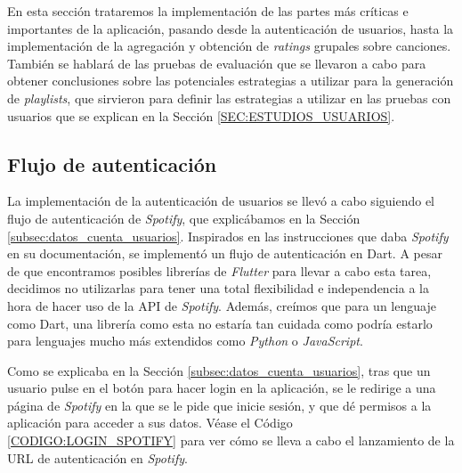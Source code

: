 En esta sección trataremos la implementación de las partes más críticas e importantes de la aplicación, pasando desde la 
autenticación de usuarios, hasta la implementación de la agregación y obtención de \textit{ratings} grupales sobre canciones. 
También se hablará de las pruebas de evaluación que se llevaron a cabo para obtener conclusiones sobre las potenciales estrategias
 a utilizar para la generación de \textit{playlists}, que sirvieron para definir las estrategias a utilizar en las pruebas con usuarios
 que se explican en la Sección \ref{SEC:ESTUDIOS_USUARIOS}.


\subsection{Flujo de autenticación\label{SEC:FLUJO_AUTENTICACION}}

La implementación de la autenticación de usuarios se llevó a cabo siguiendo el flujo de autenticación de \textit{Spotify}, que explicábamos en la Sección 
\ref{subsec:datos_cuenta_usuarios}. Inspirados en las instrucciones que daba \textit{Spotify} en su documentación, se implementó un flujo de autenticación
en Dart. A pesar de que encontramos posibles librerías de \textit{Flutter} para llevar a cabo esta tarea, decidimos no utilizarlas para tener una total flexibilidad
e independencia a la hora de hacer uso de la API de \textit{Spotify}. Además, creímos que para un lenguaje como Dart, una librería como esta no estaría tan cuidada
como podría estarlo para lenguajes mucho más extendidos como \textit{Python} o \textit{JavaScript}. 

Como se explicaba en la Sección \ref{subsec:datos_cuenta_usuarios}, tras que un usuario pulse en el botón para hacer login en la aplicación,
se le redirige a una página de \textit{Spotify} en la que se le pide que inicie sesión, y que dé permisos a la aplicación para acceder a sus datos. Véase el
Código \ref{CODIGO:LOGIN_SPOTIFY} para ver cómo se lleva a cabo el lanzamiento de la URL de autenticación en \textit{Spotify}.



